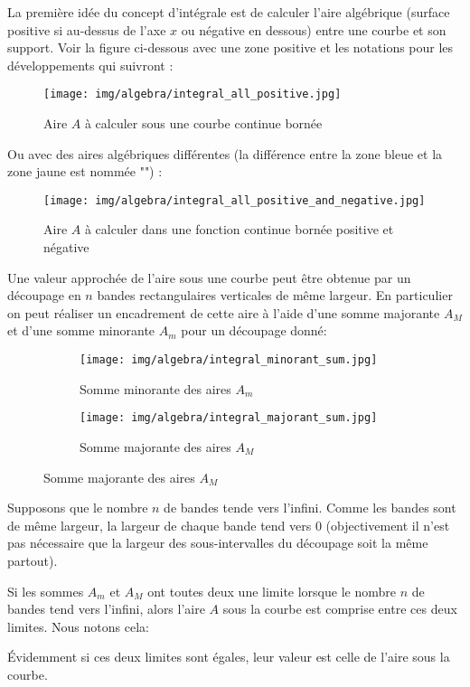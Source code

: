 		 La première idée du concept d'intégrale est de calculer l'aire algébrique (surface positive si au-dessus de l'axe $x$ ou négative en dessous) entre une courbe et son support. Voir la figure ci-dessous avec une zone positive et les notations pour les développements qui suivront :
		 \begin{figure}[H]
			\centering
			\texttt{[image: img/algebra/integral\_all\_positive.jpg]}
			\caption[]{Aire $A$ à calculer sous une courbe continue bornée}
		\end{figure}
		Ou avec des aires algébriques différentes (la différence entre la zone bleue et la zone jaune est nommée "") :
		 \begin{figure}[H]
			\centering
			\texttt{[image: img/algebra/integral\_all\_positive\_and\_negative.jpg]}
			\caption[]{Aire $A$ à calculer dans une fonction continue bornée positive et négative}
		\end{figure}
		Une valeur approchée de l'aire sous une courbe peut être obtenue par un découpage en $n$ bandes rectangulaires verticales de même largeur. En particulier on peut réaliser un encadrement de cette aire à l'aide d'une somme majorante $A_M$ et d'une somme minorante $A_m$ pour un découpage donné:
		\begin{figure}[H]
			\centering
			\begin{subfigure}{0.4\textwidth}
				\texttt{[image: img/algebra/integral\_minorant\_sum.jpg]}
				\caption{Somme minorante des aires $A_m$}
			\end{subfigure}
			\begin{subfigure}{0.4\textwidth}
				\texttt{[image: img/algebra/integral\_majorant\_sum.jpg]}
				\caption{Somme majorante des aires $A_M$}
			\end{subfigure}				
		\end{figure}
		Supposons que le nombre $n$ de bandes tende vers l'infini. Comme les bandes sont de même largeur, la largeur de chaque bande tend vers $0$ (objectivement il n'est pas nécessaire que la largeur des sous-intervalles du découpage soit la même partout).
		
		Si les sommes $A_m$ et $A_M$ ont toutes deux une limite lorsque le nombre $n$ de bandes tend vers l'infini, alors l'aire $A$ sous la courbe est comprise entre ces deux limites. Nous notons cela:
		
		Évidemment si ces deux limites sont égales, leur valeur est celle de l'aire sous la courbe.
		
